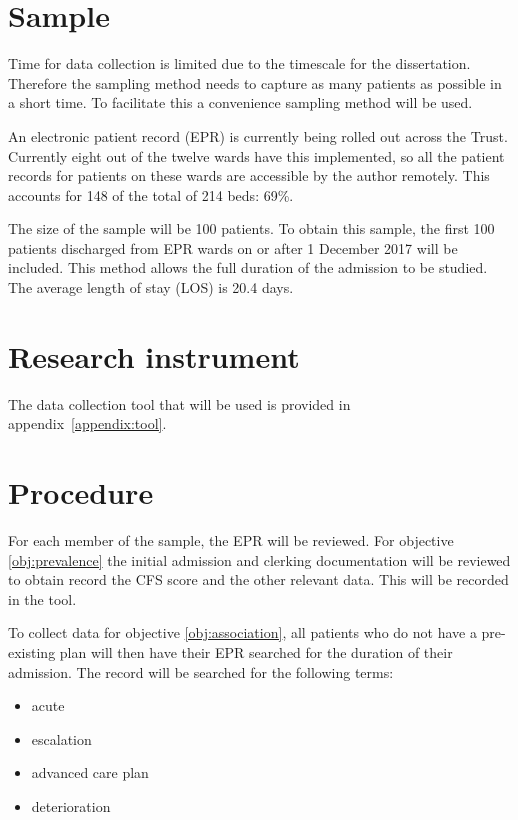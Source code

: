 \documentclass
[
	12pt,
	a4paper,
	oneside,
]{article}
\begin{document}
\section{Sample}
Time for data collection is limited due to the timescale for the dissertation. 
Therefore the sampling method needs to capture as many patients as possible in a 
short time. To facilitate this a convenience sampling method will be used.

An electronic patient record (EPR) is currently being rolled out across the Trust.
Currently eight out of the twelve wards have this implemented, so all the patient 
records for patients on these wards are accessible by the author remotely. This
accounts for 148 of the total of 214 beds: 69\%. 

The size of the sample will be 100 patients. To obtain this sample, the first 100
patients discharged from EPR wards on or after 1 December 2017 will be included.
This method allows the full duration of the admission to be studied. The average
length of stay (LOS) is 20.4 days.

\section{Research instrument}

The data collection tool that will be used is 
provided in appendix~\ref{appendix:tool}.

\section{Procedure}
\label{sec:procedure}
For each member of the sample, the EPR will be reviewed. 
For objective \ref{obj:prevalence} 
the initial admission and clerking documentation will be reviewed to obtain
record the CFS score and the other relevant data. This will be recorded in the tool.


To collect data for objective \ref{obj:association}, all patients who do not have
a pre-existing plan will then have their EPR searched
for the duration of their admission. The record will be searched for the following
terms:

\begin{itemize}
\item acute
\item escalation
\item advanced care plan
\item deterioration
\end{itemize}
\end{document}
